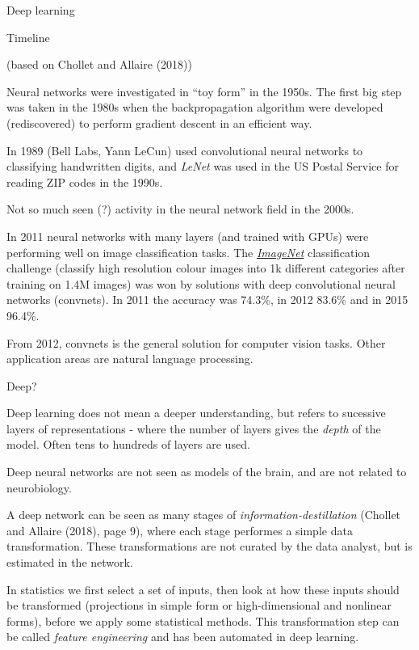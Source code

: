 \documentclass[10pt,ignorenonframetext,]{beamer}
\begin{document}
\begin{frame}{Deep learning}
\protect\hypertarget{deep-learning}{}

\begin{block}{Timeline}

(based on Chollet and Allaire (2018))

Neural networks were investigated in ``toy form'' in the 1950s. The
first big step was taken in the 1980s when the backpropagation algorithm
were developed (rediscovered) to perform gradient descent in an
efficient way.

In 1989 (Bell Labs, Yann LeCun) used convolutional neural networks to
classifying handwritten digits, and \emph{LeNet} was used in the US
Postal Service for reading ZIP codes in the 1990s.

Not so much seen (?) activity in the neural network field in the 2000s.

\end{block}

\end{frame}

\begin{frame}

In 2011 neural networks with many layers (and trained with GPUs) were
performing well on image classification tasks. The
\href{http://www.image-net.org/}{\emph{ImageNet}} classification
challenge (classify high resolution colour images into 1k different
categories after training on 1.4M images) was won by solutions with deep
convolutional neural networks (convnets). In 2011 the accuracy was
74.3\%, in 2012 83.6\% and in 2015 96.4\%.

From 2012, convnets is the general solution for computer vision tasks.
Other application areas are natural language processing.

\end{frame}

\begin{frame}

\begin{block}{Deep?}

Deep learning does not mean a deeper understanding, but refers to
sucessive layers of representations - where the number of layers gives
the \emph{depth} of the model. Often tens to hundreds of layers are
used.

Deep neural networks are not seen as models of the brain, and are not
related to neurobiology.

A deep network can be seen as many stages of
\emph{information-destillation} (Chollet and Allaire (2018), page 9),
where each stage performes a simple data transformation. These
transformations are not curated by the data analyst, but is estimated in
the network.

In statistics we first select a set of inputs, then look at how these
inputs should be transformed (projections in simple form or
high-dimensional and nonlinear forms), before we apply some statistical
methods. This transformation step can be called \emph{feature
engineering} and has been automated in deep learning.

\end{block}

\end{frame}
\end{document}
